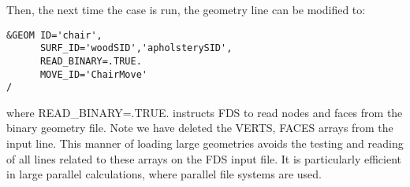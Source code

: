 \documentclass[12pt]{article}
\begin{document}
Then, the next time the case is run, the geometry line can be modified to:
{\small
\begin{verbatim}
&GEOM ID='chair',
      SURF_ID='woodSID','apholsterySID',
      READ_BINARY=.TRUE.
      MOVE_ID='ChairMove'
/
\end{verbatim}
}

where {\ct READ\_BINARY=.TRUE.} instructs FDS to read nodes and faces from the binary geometry file.
Note we have deleted the {\ct VERTS, FACES} arrays from the input line. 
This manner of loading large geometries avoids the testing and reading of all lines related to these arrays on the FDS input file.
It is particularly efficient in large parallel calculations, where parallel file systems are used.  


%
%
%
%
%
%
%
%
\end{document}
